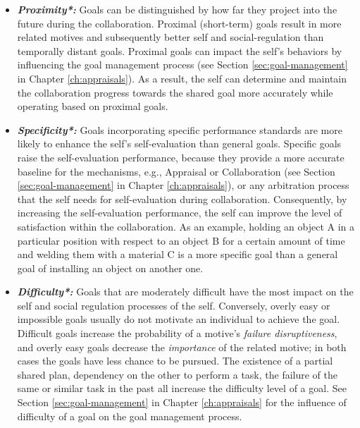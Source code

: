 \documentclass[12pt]{report}
\begin{document}
\vspace*{-3mm}
\begin{itemize}
  \item \textbf{\textit{Proximity*:}} Goals can be distinguished by how far they
  project into the future during the collaboration. Proximal (short-term) goals
  result in more related motives and subsequently better self and
  social-regulation than temporally distant goals. Proximal goals can impact
  the self's behaviors by influencing the goal management process (see Section
  \ref{sec:goal-management} in Chapter \ref{ch:appraisals}). As a result, the
  self can determine and maintain the collaboration progress towards the shared
  goal more accurately while operating based on proximal goals.
  
  \item \textbf{\textit{Specificity*:}} Goals incorporating specific performance
  standards are more likely to enhance the self's self-evaluation than general
  goals. Specific goals raise the self-evaluation performance, because they
  provide a more accurate baseline for the mechanisms, e.g., Appraisal or
  Collaboration (see Section \ref{sec:goal-management} in Chapter
  \ref{ch:appraisals}), or any arbitration process that the self needs for
  self-evaluation during collaboration. Consequently, by increasing the
  self-evaluation performance, the self can improve the level of satisfaction
  within the collaboration. As an example, holding an object A in a particular
  position with respect to an object B for a certain amount of time and welding
  them with a material C is a more specific goal than a general goal of
  installing an object on another one.
  
  \item \textbf{\textit{Difficulty*:}} Goals that are moderately difficult have
  the most impact on the self and social regulation processes of the self.
  Conversely, overly easy or impossible goals usually do not motivate an
  individual to achieve the goal. Difficult goals increase the probability of a
  motive's \textit{failure disruptiveness}, and overly easy goals decrease the
  \textit{importance} of the related motive; in both cases the goals have less
  chance to be pursued. The existence of a partial shared plan, dependency on
  the other to perform a task, the failure of the same or similar task in the
  past all increase the difficulty level of a goal. See Section
  \ref{sec:goal-management} in Chapter \ref{ch:appraisals} for the influence of
  difficulty of a goal on the goal management process.
\end{itemize}
\end{document}
